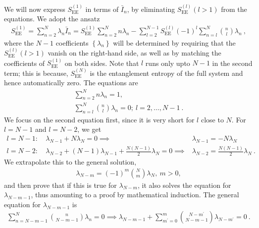 \documentclass[reprint,hidelinks,onecolumn]{revtex4-2}
\begin{document}
We will now express \(S_\text{EE}^{(1)}\) in terms of \(\bar I_n\), by eliminating \(S_\text{EE}^{(l)} (l > 1)\) from the equations. We adopt the ansatz
\begin{equation}\begin{aligned}\label{expansion}
	S_\text{EE}^{(1)} = \sum_{n=2}^N \lambda_n \bar I_n = S_\text{EE}^{(1)}\sum_{n=2}^N n \lambda_n - \sum_{l=2}^{N-1} S_\text{EE}^{(l)} (-1)^{l} \sum_{n=l}^N \binom{n}{l} \lambda_n~,
\end{aligned}\end{equation}
where the \(N-1\) coefficients \(\left\{ \lambda_n \right\} \) will be determined by requiring that the \(S_\text{EE}^{(l)} (l > 1)\) vanish on the right-hand side, as well as by matching the coefficients of \(S_\text{EE}^{(1)}\) on both sides. Note that \(l\) runs only upto \(N-1\) in the second term; this is because, \(S_\text{EE}^{(N)}\) is the entanglement entropy of the full system and hence automatically zero. The equations are
\begin{gather}\label{equation1}
	\sum_{n=2}^N n \lambda_n = 1,\\
	\sum_{n=l}^N \binom{n}{l} \lambda_n = 0;~l=2,\ldots,N-1~.
\end{gather}
We focus on the second equation first, since it is very short for \(l\) close to \(N\). For \(l=N-1\) and \(l=N-2\), we get
\begin{equation}\begin{aligned}
	l=N-1:~&\lambda_{N-1} + N\lambda_{N} = 0 \implies &\lambda_{N-1} = -N \lambda_N\\
	l=N-2:~&\lambda_{N-2} + \left(N-1\right) \lambda_{N-1} + \frac{N(N-1)}{2}\lambda_{N} = 0 \implies &\lambda_{N-2} = \frac{N(N-1)}{2}\lambda_N~.
\end{aligned}\end{equation}
We extrapolate this to the general solution,
\begin{equation}\begin{aligned}\label{coeffSolution}
	\lambda_{N-m} = (-1)^m \binom{N}{m} \lambda_N,~m>0,
\end{aligned}\end{equation}
and then prove that if this is true for \(\lambda_{N-m}\), it also solves the equation for \(\lambda_{N-m-1}\), thus amounting to a proof by mathematical induction. The general equation for \(\lambda_{N-m-1}\) is
\begin{equation}\begin{aligned}
	\sum_{n=N-m-1}^N \binom{n}{N-m-1} \lambda_n = 0 \implies \lambda_{N-m-1} + \sum_{m^\prime=0}^{m}\binom{N-m^\prime}{N-m-1} \lambda_{N-m^\prime} = 0~.
\end{aligned}\end{equation}
\end{document}
